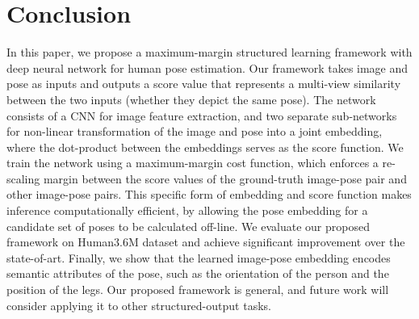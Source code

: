 \documentclass[10pt,twocolumn,letterpaper]{article}
\begin{document}
\section{Conclusion}
\vspace{-0.1in}
In this paper, we propose a maximum-margin structured learning framework with deep neural network for human pose estimation. 
Our framework takes image and pose as inputs and outputs a score value that represents a multi-view similarity between the two inputs (whether they depict  the same pose).
The network consists of a CNN for image feature extraction, and two separate sub-networks for non-linear transformation of the image and pose into a joint embedding, where the dot-product between the embeddings  serves as the score function.
We train the network using a maximum-margin cost function, which enforces a re-scaling margin between the score values of the ground-truth image-pose pair and other image-pose pairs.
This specific form of embedding and score function makes inference computationally efficient, by allowing the pose embedding for a candidate set of poses to be calculated off-line.
We evaluate our proposed framework on Human3.6M dataset and achieve significant improvement over the state-of-art.
Finally, we show that the learned image-pose embedding encodes semantic attributes of the pose, such as the orientation of the person and the position of the legs.
Our proposed framework is general, and future work will consider applying it to other structured-output tasks.








{\small


} 
 
\end{document}
